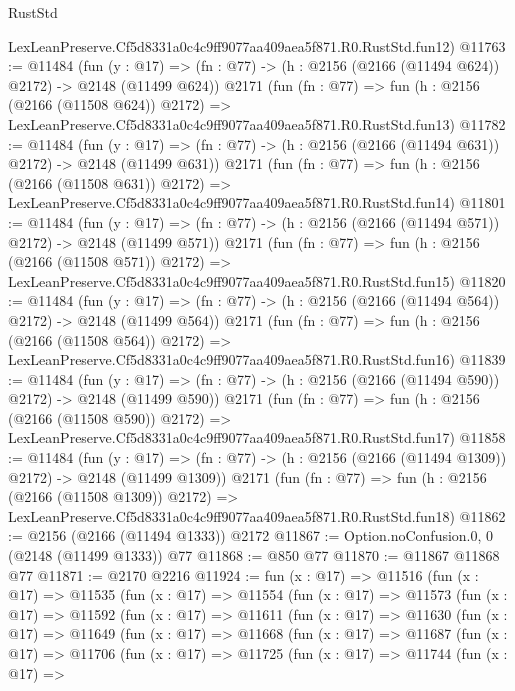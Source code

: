 \begin{lexlean}{RustStd}
\begin{coremodule}
    LexLeanPreserve.Cf5d8331a0c4c9ff9077aa409aea5f871.R0.RustStd.fun12)
@11763 := @11484
    (fun (y : @17) => (fn : @77) -> (h : @2156 (@2166 (@11494 @624)) @2172) -> @2148 (@11499 @624))
    @2171
    (fun (fn : @77) =>
    fun (h : @2156 (@2166 (@11508 @624)) @2172) =>
    LexLeanPreserve.Cf5d8331a0c4c9ff9077aa409aea5f871.R0.RustStd.fun13)
@11782 := @11484
    (fun (y : @17) => (fn : @77) -> (h : @2156 (@2166 (@11494 @631)) @2172) -> @2148 (@11499 @631))
    @2171
    (fun (fn : @77) =>
    fun (h : @2156 (@2166 (@11508 @631)) @2172) =>
    LexLeanPreserve.Cf5d8331a0c4c9ff9077aa409aea5f871.R0.RustStd.fun14)
@11801 := @11484
    (fun (y : @17) => (fn : @77) -> (h : @2156 (@2166 (@11494 @571)) @2172) -> @2148 (@11499 @571))
    @2171
    (fun (fn : @77) =>
    fun (h : @2156 (@2166 (@11508 @571)) @2172) =>
    LexLeanPreserve.Cf5d8331a0c4c9ff9077aa409aea5f871.R0.RustStd.fun15)
@11820 := @11484
    (fun (y : @17) => (fn : @77) -> (h : @2156 (@2166 (@11494 @564)) @2172) -> @2148 (@11499 @564))
    @2171
    (fun (fn : @77) =>
    fun (h : @2156 (@2166 (@11508 @564)) @2172) =>
    LexLeanPreserve.Cf5d8331a0c4c9ff9077aa409aea5f871.R0.RustStd.fun16)
@11839 := @11484
    (fun (y : @17) => (fn : @77) -> (h : @2156 (@2166 (@11494 @590)) @2172) -> @2148 (@11499 @590))
    @2171
    (fun (fn : @77) =>
    fun (h : @2156 (@2166 (@11508 @590)) @2172) =>
    LexLeanPreserve.Cf5d8331a0c4c9ff9077aa409aea5f871.R0.RustStd.fun17)
@11858 := @11484
    (fun (y : @17) =>
    (fn : @77) -> (h : @2156 (@2166 (@11494 @1309)) @2172) -> @2148 (@11499 @1309))
    @2171
    (fun (fn : @77) =>
    fun (h : @2156 (@2166 (@11508 @1309)) @2172) =>
    LexLeanPreserve.Cf5d8331a0c4c9ff9077aa409aea5f871.R0.RustStd.fun18)
@11862 := @2156 (@2166 (@11494 @1333)) @2172
@11867 := Option.noConfusion.{0, 0} (@2148 (@11499 @1333)) @77
@11868 := @850 @77
@11870 := @11867 @11868 @77
@11871 := @2170 @2216
@11924 := fun (x : @17) =>
  @11516
    (fun (x : @17) =>
    @11535
      (fun (x : @17) =>
      @11554
        (fun (x : @17) =>
        @11573
          (fun (x : @17) =>
          @11592
            (fun (x : @17) =>
            @11611
              (fun (x : @17) =>
              @11630
                (fun (x : @17) =>
                @11649
                  (fun (x : @17) =>
                  @11668
                    (fun (x : @17) =>
                    @11687
                      (fun (x : @17) =>
                      @11706
                        (fun (x : @17) =>
                        @11725
                          (fun (x : @17) =>
                          @11744
                            (fun (x : @17) =>

\end{coremodule}
\end{lexlean}
